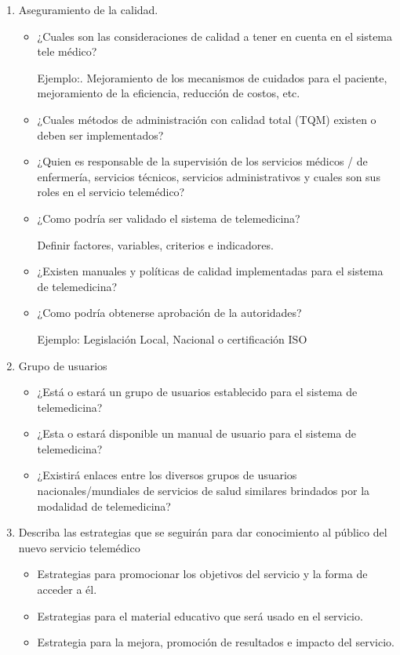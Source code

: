 \begin{enumerate}
\item Aseguramiento de la calidad.
\begin{itemize}
\item ¿Cuales son las consideraciones de calidad a tener en cuenta en el sistema tele médico?

Ejemplo:. Mejoramiento de los mecanismos de cuidados para el paciente, mejoramiento de la eficiencia, reducción de costos, etc.

\item ¿Cuales métodos de administración con calidad total (TQM) existen o deben ser implementados? 

\item ¿Quien es responsable de la supervisión de los servicios médicos / de enfermería,  servicios técnicos, servicios administrativos y cuales son sus roles en el servicio telemédico?

\item ¿Como podría ser validado el sistema de telemedicina? 

Definir factores, variables, criterios e indicadores.

\item ¿Existen manuales y políticas de calidad implementadas para el sistema de telemedicina?

\item ¿Como podría obtenerse aprobación de la autoridades? 

Ejemplo: Legislación Local, Nacional o certificación ISO 
\end{itemize}


\item Grupo de usuarios

\begin{itemize}
\item ¿Está o estará un grupo de usuarios establecido para el sistema de telemedicina? 
\item ¿Esta o estará disponible un manual de usuario para el sistema de telemedicina? 
\item ¿Existirá enlaces entre los diversos grupos de usuarios nacionales/mundiales de servicios de salud similares brindados por la modalidad de telemedicina?
\end{itemize}


\item Describa las estrategias que se seguirán para dar conocimiento al público del nuevo servicio telemédico

\begin{itemize}
\item Estrategias para promocionar los objetivos del servicio y la forma de acceder a él.
\item Estrategias para el material educativo que será usado en el servicio. 
\item Estrategia para la mejora, promoción de resultados e impacto del servicio.
\end{itemize}


\end{enumerate}
